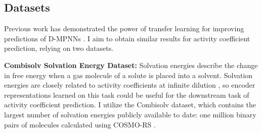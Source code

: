 




\subsection{Datasets}

Previous work has demonstrated the power of transfer learning for improving predictions of D-MPNNs \cite{Vermeire2021}. I aim to obtain similar results for activity coefficient prediction, relying on two datasets.

\noindent
\textbf{Combisolv Solvation Energy Dataset:} Solvation energies describe the change in free energy when a gas molecule of a solute is placed into a solvent. Solvation energies are closely related to activity coefficients at infinite dilution \cite{Moine2017}, so encoder representations learned on this task could be useful for the downstream task of activity coefficient prediction. I utilize the Combisolv dataset, which contains the largest number of solvation energies publicly available to date: one million binary pairs of molecules calculated using COSMO-RS \cite{Vermeire2021}.

